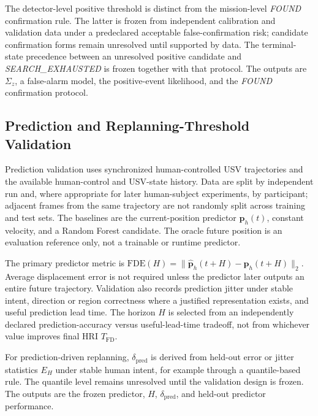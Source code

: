 \documentclass[letterpaper, 10pt, conference]{ieeeconf}
\begin{document}
The detector-level positive threshold is distinct from the mission-level \emph{FOUND} confirmation rule. The latter is frozen from independent calibration and validation data under a predeclared acceptable false-confirmation risk; candidate confirmation forms remain unresolved until supported by data. The terminal-state precedence between an unresolved positive candidate and \emph{SEARCH\_EXHAUSTED} is frozen together with that protocol. The outputs are \(\Sigma_z\), a false-alarm model, the positive-event likelihood, and the \emph{FOUND} confirmation protocol.

\subsection{Prediction and Replanning-Threshold Validation}


Prediction validation uses synchronized human-controlled USV trajectories and the available human-control and USV-state history. Data are split by independent run and, where appropriate for later human-subject experiments, by participant; adjacent frames from the same trajectory are not randomly split across training and test sets. The baselines are the current-position predictor \(\mathbf{p}_h(t)\), constant velocity, and a Random Forest candidate. The oracle future position is an evaluation reference only, not a trainable or runtime predictor.

The primary predictor metric is \(\mathrm{FDE}(H)=\lVert\hat{\mathbf{p}}_h(t+H)-\mathbf{p}_h(t+H)\rVert_2\). Average displacement error is not required unless the predictor later outputs an entire future trajectory. Validation also records prediction jitter under stable intent, direction or region correctness where a justified representation exists, and useful prediction lead time. The horizon \(H\) is selected from an independently declared prediction-accuracy versus useful-lead-time tradeoff, not from whichever value improves final HRI \(T_{\mathrm{FD}}\).

For prediction-driven replanning, \(\delta_{\mathrm{pred}}\) is derived from held-out error or jitter statistics \(E_H\) under stable human intent, for example through a quantile-based rule. The quantile level remains unresolved until the validation design is frozen. The outputs are the frozen predictor, \(H\), \(\delta_{\mathrm{pred}}\), and held-out predictor performance.
\end{document}
